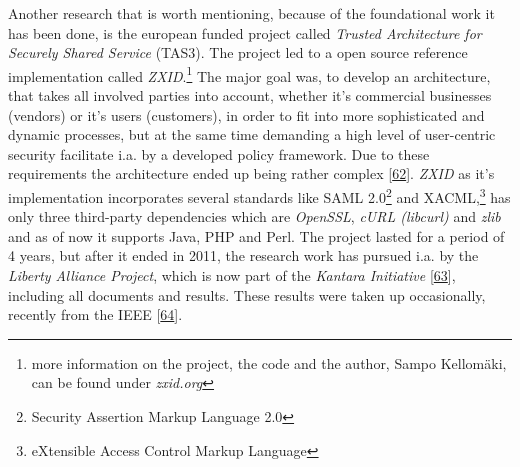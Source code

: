 \documentclass[12pt,english,a4paper,titlepage,cleardoublepage=empty,dottedtoc]{report}
\begin{document}
Another research that is worth mentioning, because of the foundational
work it has been done, is the european funded project called
\emph{Trusted Architecture for Securely Shared Service} (TAS3). The
project led to a open source reference implementation called
\emph{ZXID}.\footnote{more information on the project, the code and the
  author, Sampo Kellomäki, can be found under \emph{zxid.org}} The major
goal was, to develop an architecture, that takes all involved parties
into account, whether it's commercial businesses (vendors) or it's users
(customers), in order to fit into more sophisticated and dynamic
processes, but at the same time demanding a high level of user-centric
security facilitate i.a. by a developed policy framework. Due to these
requirements the architecture ended up being rather complex
{[}\protect\hyperlink{ref-graphic_2011_architecture_components-of-organization-domain}{62}{]}.
\emph{ZXID} as it's implementation incorporates several standards like
SAML 2.0\footnote{Security Assertion Markup Language 2.0} and
XACML,\footnote{eXtensible Access Control Markup Language} has only
three third-party dependencies which are \emph{OpenSSL}, \emph{cURL
(libcurl)} and \emph{zlib} and as of now it supports Java, PHP and Perl.
The project lasted for a period of 4 years, but after it ended in 2011,
the research work has pursued i.a. by the \emph{Liberty Alliance
Project}, which is now part of the \emph{Kantara Initiative}
{[}\protect\hyperlink{ref-web_kantara-initiative}{63}{]}, including all
documents and results. These results were taken up occasionally,
recently from the IEEE
{[}\protect\hyperlink{ref-paper_2014_personal-data-store-approach}{64}{]}.
\end{document}
